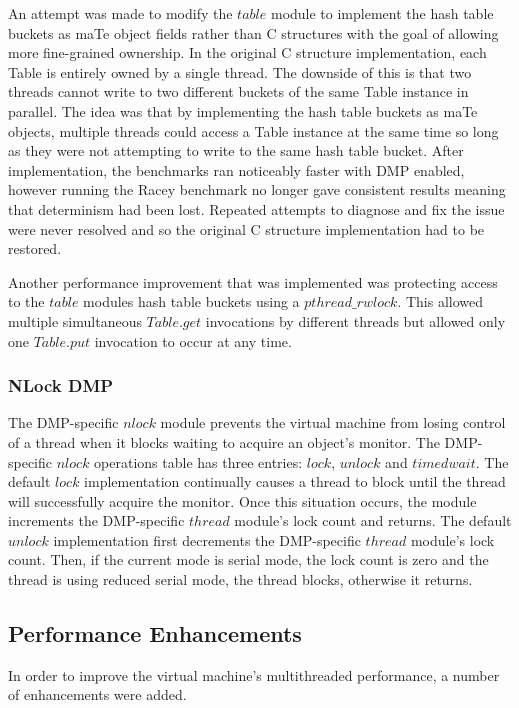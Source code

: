 An attempt was made to modify the $table$ module to implement the hash
table buckets as maTe object fields rather than C structures with the
goal of allowing more fine-grained ownership.  In the original C
structure implementation, each Table is entirely owned by a single
thread.  The downside of this is that two threads cannot write to two
different buckets of the same Table instance in parallel.  The idea
was that by implementing the hash table buckets as maTe objects,
multiple threads could access a Table instance at the same time so
long as they were not attempting to write to the same hash table
bucket.  After implementation, the benchmarks ran noticeably faster
with DMP enabled, however running the Racey benchmark no longer gave
consistent results meaning that determinism had been lost.  Repeated
attempts to diagnose and fix the issue were never resolved and so the
original C structure implementation had to be restored.

Another performance improvement that was implemented was protecting
access to the $table$ modules hash table buckets using a
$pthread\_rwlock$.  This allowed multiple simultaneous $Table.get$
invocations by different threads but allowed only one $Table.put$
invocation to occur at any time.

\subsubsection{NLock DMP}

The DMP-specific $nlock$ module prevents the virtual machine from
losing control of a thread when it blocks waiting to acquire an
object's monitor.  The DMP-specific $nlock$ operations table has three
entries: $lock$, $unlock$ and $timedwait$.  The default $lock$
implementation continually causes a thread to block until the thread
will successfully acquire the monitor.  Once this situation occurs,
the module increments the DMP-specific $thread$ module's lock count
and returns.  The default $unlock$ implementation first decrements the
DMP-specific $thread$ module's lock count. Then, if the current mode
is serial mode, the lock count is zero and the thread is using reduced
serial mode, the thread blocks, otherwise it returns.

\subsection{Performance Enhancements}

In order to improve the virtual machine's multithreaded performance, a
number of enhancements were added.

